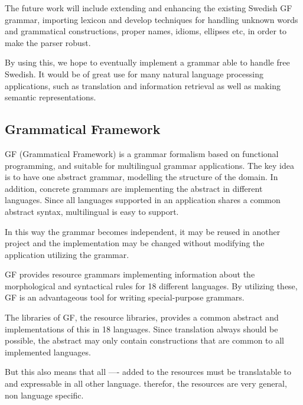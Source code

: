 \documentclass[submission,copyright,creativecommons]{eptcs} %
\begin{document}
The future work will include extending and enhancing the existing Swedish GF grammar,
importing lexicon and develop techniques for handling unknown words and grammatical
constructions, proper names, idioms, ellipses etc, in order to make the parser robust.

By using this, we hope to eventually implement a grammar able to handle free %
Swedish. It would be of great use for many natural
language processing applications, such as translation and information retrieval
as well as making semantic representations.


\subsection{Grammatical Framework}


GF\cite{gf} (Grammatical Framework) is a grammar formalism based on functional programming,
and suitable for multilingual grammar applications. The key idea is to have
one abstract grammar, modelling the structure of the domain. 
In addition, concrete grammars are implementing the abstract in different languages.
Since all languages supported in an application shares a common abstract syntax,
multilingual is easy to support.

In this way the grammar becomes independent, it may be reused in another project
and the implementation may be changed without modifying the application utilizing the grammar.

GF provides resource grammars\cite{resource} implementing information about the morphological and
syntactical rules for 18 different languages. By utilizing these, 
GF is an advantageous tool for writing special-purpose grammars.

  
The libraries of GF, the resource libraries\cite{resource}, provides
a common abstract and implementations of this in 18 languages.
Since translation always should be possible, the abstract may only contain constructions that
are common to all implemented languages.

  But this also means that all ---- added to the resources
  must be translatable to and expressable in all other language.
 therefor, the resources are very general, non language specific.
\end{document}
